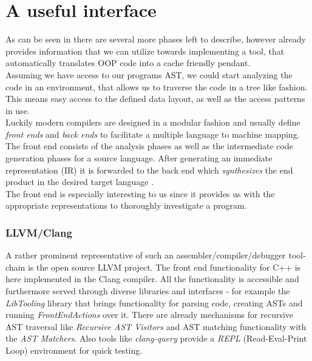 \section{A useful interface}
As can be seen in  there are several more phases left to describe, however  already provides information that we can utilize towards implementing a tool, that automatically translates OOP code into a cache friendly pendant.\\
Assuming we have access to our programs AST, we could start analyzing the code in an environment, that allows us to traverse the code in a tree like fashion. This means easy access to the defined data layout, as well as the access patterns in use.\\
Luckily modern compilers are designed in a modular fashion and usually define \textit{front ends} and \textit{back ends} to facilitate a multiple language to machine mapping. The front end consists of the analysis phases as well as the intermediate code generation phases for a source language. After generating an immediate representation (IR) it is forwarded to the back end which \textit{synthesizes} the end product in the desired target language .\\
The front end is especially interesting to us since it provides us with the appropriate representations to thoroughly investigate a program. 

\subsubsection{LLVM/Clang}
A rather prominent representative of such an assembler/compiler/debugger tool-chain is the open source LLVM project. The front end functionality for C++ is here implemented in the Clang compiler. All the functionality is accessible and furthermore served through diverse libraries and interfaces - for example the \textit{LibTooling} library that brings functionality for parsing code, creating ASTs and running \textit{FrontEndActions} over it. There are already mechanisms for recursive AST traversal like \textit{Recursive AST Visitors} and AST matching functionality with the \textit{AST Matchers}. Also tools like \textit{clang-query} provide a \textit{REPL} (Read-Eval-Print Loop) environment for quick testing.





